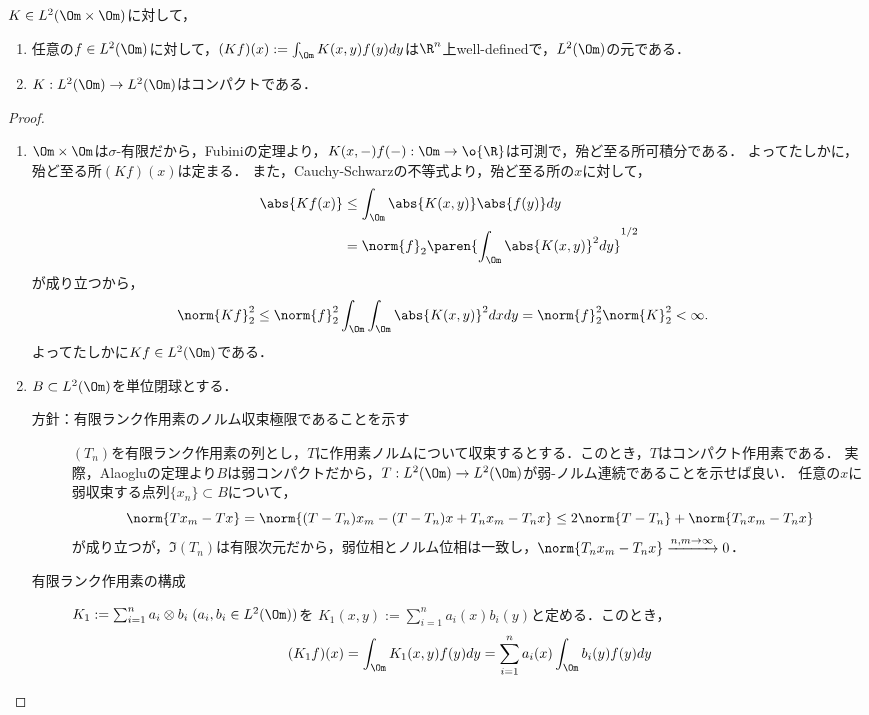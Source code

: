 \documentclass[uplatex,dvipdfmx]{jsarticle}
\begin{document}
\begin{proposition}
    $K\in L^2(\Om\times\Om)$に対して，
    \begin{enumerate}
        \item 任意の$f\in L^2(\Om)$に対して，$(Kf)(x):=\int_\Om K(x,y)f(y)dy$は$\R^n$上well-definedで，$L^2(\Om)$の元である．
        \item $K:L^2(\Om)\to L^2(\Om)$はコンパクトである．
    \end{enumerate}
\end{proposition}
\begin{proof}\mbox{}
    \begin{enumerate}
        \item $\Om\times\Om$は$\sigma$-有限だから，Fubiniの定理より，$K(x,-)f(-):\Om\to\o{\R}$は可測で，殆ど至る所可積分である．
        よってたしかに，殆ど至る所$(Kf)(x)$は定まる．
        また，Cauchy-Schwarzの不等式より，殆ど至る所の$x$に対して，
        \begin{align*}
            \abs{Kf(x)}&\le\int_\Om\abs{K(x,y)}\abs{f(y)}dy\\
            &=\norm{f}_2\paren{\int_\Om\abs{K(x,y)}^2dy}^{1/2}
        \end{align*}
        が成り立つから，
        \begin{align*}
            \norm{Kf}_2^2&\le\norm{f}_2^2\int_\Om\int_\Om\abs{K(x,y)}^2dxdy=\norm{f}_2^2\norm{K}_2^2<\infty.
        \end{align*}
        よってたしかに$Kf\in L^2(\Om)$である．
        \item $B\subset L^2(\Om)$を単位閉球とする．
        \begin{description}
            \item[方針：有限ランク作用素のノルム収束極限であることを示す] $(T_n)$を有限ランク作用素の列とし，$T$に作用素ノルムについて収束するとする．このとき，$T$はコンパクト作用素である．
            実際，Alaogluの定理より$B$は弱コンパクトだから，$T:L^2(\Om)\to L^2(\Om)$が弱-ノルム連続であることを示せば良い．
            任意の$x$に弱収束する点列$\{x_n\}\subset B$について，
            \[\norm{Tx_m-Tx}=\norm{(T-T_n)x_m-(T-T_n)x+T_nx_m-T_nx}\le2\norm{T-T_n}+\norm{T_nx_m-T_nx}\]
            が成り立つが，$\Im(T_n)$は有限次元だから，弱位相とノルム位相は一致し，$\norm{T_nx_m-T_nx}\xrightarrow{n,m\to\infty}0$．
            \item[有限ランク作用素の構成] 
            $K_1:=\sum_{i=1}^na_i\otimes b_i\;(a_i,b_i\in L^2(\Om))$を
            $K_1(x,y):=\sum_{i=1}^na_i(x)b_i(y)$と定める．このとき，
            \[(K_1f)(x)=\int_\Om K_1(x,y)f(y)dy=\sum_{i=1}^na_i(x)\int_\Om b_i(y)f(y)dy\]

\end{description}
\end{enumerate}
\end{proof}
\end{document}
